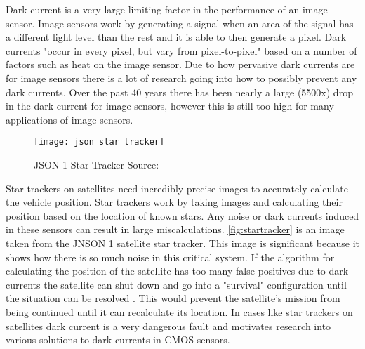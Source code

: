 \par Dark current is a very large limiting factor in the performance of an image sensor. Image sensors work by generating a signal when an area of the signal has a different light level than the rest and it is able to then generate a pixel. Dark currents "occur in every pixel, but vary from pixel-to-pixel" based on a number of factors such as heat on the image sensor. Due to how pervasive dark currents are for image sensors there is a lot of research going into how to possibly prevent any dark currents. Over the past 40 years there has been nearly a large (5500x) drop in the dark current for image sensors, however this is still too high for many applications of image sensors\cite{mcgrath_tobin_goiffon_magan_2018}.
\begin{figure}[H]
    \texttt{[image: json star tracker]}
    \caption{JSON 1 Star Tracker Source:\cite{bardoux_penquer_gilard_ecoffet_auvergne_2017}}
    \label{fig:startracker}
\end{figure}
\par Star trackers on satellites need incredibly precise images to accurately calculate the vehicle position. Star trackers work by taking images and calculating their position based on the location of known stars. Any noise or dark currents induced in these sensors can result in large miscalculations. \autoref{fig:startracker} is an image taken from the JNSON 1 satellite star tracker. This image is significant because it shows how there is so much noise in this critical system. If the algorithm for calculating the position of the satellite has too many false positives due to dark currents the satellite can shut down and go into a "survival" configuration until the situation can be resolved \cite{bardoux_penquer_gilard_ecoffet_auvergne_2017}. This would prevent the satellite's mission from being continued until it can recalculate its location. In cases like star trackers on satellites dark current is a very dangerous fault and motivates research into various solutions to dark currents in CMOS sensors.